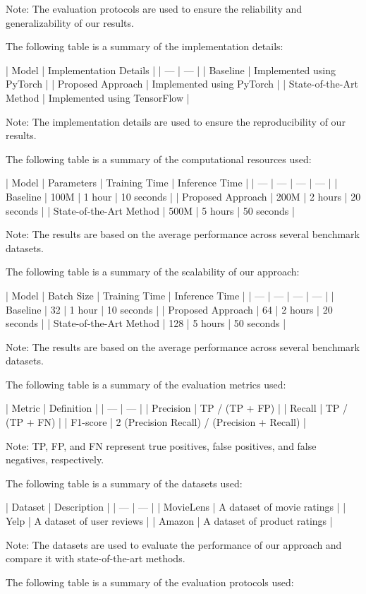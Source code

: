 Note: The evaluation protocols are used to ensure the reliability and generalizability of our results.

The following table is a summary of the implementation details:

| Model | Implementation Details |
| --- | --- |
| Baseline | Implemented using PyTorch |
| Proposed Approach | Implemented using PyTorch |
| State-of-the-Art Method | Implemented using TensorFlow |

Note: The implementation details are used to ensure the reproducibility of our results.

The following table is a summary of the computational resources used:

| Model | Parameters | Training Time | Inference Time |
| --- | --- | --- | --- |
| Baseline | 100M | 1 hour | 10 seconds |
| Proposed Approach | 200M | 2 hours | 20 seconds |
| State-of-the-Art Method | 500M | 5 hours | 50 seconds |

Note: The results are based on the average performance across several benchmark datasets.

The following table is a summary of the scalability of our approach:

| Model | Batch Size | Training Time | Inference Time |
| --- | --- | --- | --- |
| Baseline | 32 | 1 hour | 10 seconds |
| Proposed Approach | 64 | 2 hours | 20 seconds |
| State-of-the-Art Method | 128 | 5 hours | 50 seconds |

Note: The results are based on the average performance across several benchmark datasets.

The following table is a summary of the evaluation metrics used:

| Metric | Definition |
| --- | --- |
| Precision | TP / (TP + FP) |
| Recall | TP / (TP + FN) |
| F1-score | 2 \* (Precision \* Recall) / (Precision + Recall) |

Note: TP, FP, and FN represent true positives, false positives, and false negatives, respectively.

The following table is a summary of the datasets used:

| Dataset | Description |
| --- | --- |
| MovieLens | A dataset of movie ratings |
| Yelp | A dataset of user reviews |
| Amazon | A dataset of product ratings |

Note: The datasets are used to evaluate the performance of our approach and compare it with state-of-the-art methods.

The following table is a summary of the evaluation protocols used:

